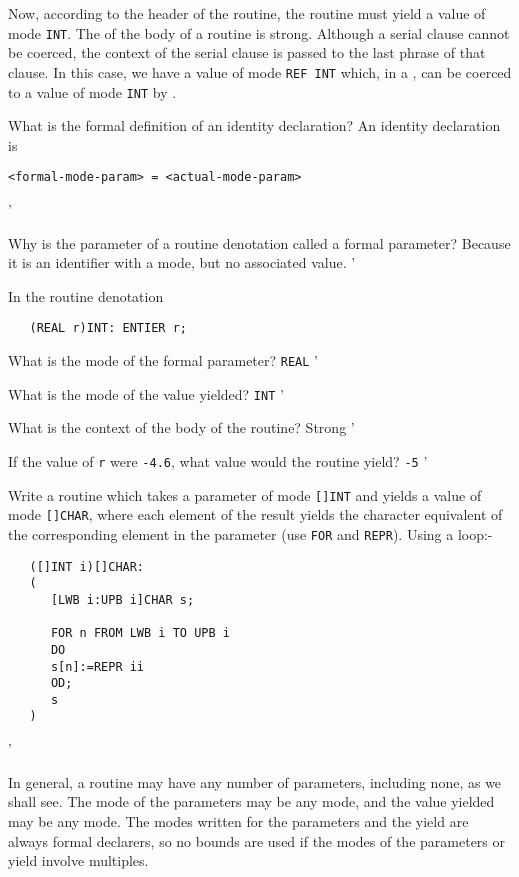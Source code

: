 Now, according to the header of the routine, the routine must yield a
value of mode \verb|INT|.  The  of the
body of a routine is strong.  Although a serial
clause cannot be coerced, the context of the serial clause is passed
to the last phrase of that clause.  In this case, we have a value of
mode \verb|REF INT| which, in a ,
can be coerced to a value of mode \verb|INT| by
.

\begin{exercise}
\item What is the formal definition of an identity declaration?
\ans An identity declaration is
\begin{verbatim}
<formal-mode-param> = <actual-mode-param>
\end{verbatim}
'
\item Why is the parameter of a routine denotation called a formal
parameter? \ans Because it is an identifier with a mode, but no
associated value.
'
\item In the routine denotation
\begin{verbatim}
   (REAL r)INT: ENTIER r;
\end{verbatim}
\indent\begin{subex}
\item What is the mode of the formal parameter? \subans \verb|REAL|
'
\item What is the mode of the value yielded? \subans \verb|INT|
'
\item What is the context of the body of the routine? \subans Strong
'
\item If the value of \verb|r| were \verb|-4.6|, what value
would the routine yield? \subans \verb|-5|
'
\end{subex}
\item Write a routine which takes a parameter of mode \verb|[]INT| and
yields a value of mode \verb|[]CHAR|, where each element of the result
yields the character equivalent of the corresponding element in the
parameter (use \verb|FOR| and \verb|REPR|). \ans Using a loop:-
\begin{verbatim}
   ([]INT i)[]CHAR:
   (
      [LWB i:UPB i]CHAR s;

      FOR n FROM LWB i TO UPB i
      DO
      s[n]:=REPR ii
      OD;
      s
   )
\end{verbatim}
'
\end{exercise}
\vfill

In general, a routine may have any number of parameters, including
none, as we shall see. The mode of the parameters may be any mode,
and the value yielded may be any mode. The modes written for the
parameters and the yield are always formal declarers, so no bounds
are used if the modes of the parameters or yield involve multiples.


